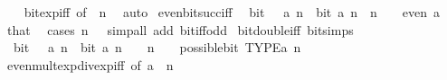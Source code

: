 \begin{isabellebody}
%
\isadelimproof
\ \ %
\endisadelimproof
%
\isatagproof
{}\isamarkupfalse%
\ bit{\isacharunderscore}{\kern0pt}exp{\isacharunderscore}{\kern0pt}iff\ {\isacharbrackleft}{\kern0pt}of\ {}\ n{\isacharbrackright}{\kern0pt}\ \isamarkupfalse%
\ auto%
\endisatagproof
{\isafoldproof}%
%
\isadelimproof
\isanewline
%
\endisadelimproof
\isanewline
{}\isamarkupfalse%
\ even{\isacharunderscore}{\kern0pt}bit{\isacharunderscore}{\kern0pt}succ{\isacharunderscore}{\kern0pt}iff{\isacharcolon}{\kern0pt}\isanewline
\ \ {\isacartoucheopen}bit\ {\isacharparenleft}{\kern0pt}{}\ {\isacharplus}{\kern0pt}\ a{\isacharparenright}{\kern0pt}\ n\ {\isasymlongleftrightarrow}\ bit\ a\ n\ {\isasymor}\ n\ {\isacharequal}{\kern0pt}\ {}{\isacartoucheclose}\ \ {\isacartoucheopen}even\ a{\isacartoucheclose}\isanewline
%
\isadelimproof
\ \ %
\endisadelimproof
%
\isatagproof
{}\isamarkupfalse%
\ that\ \isamarkupfalse%
\ {\isacharparenleft}{\kern0pt}cases\ {\isacartoucheopen}n\ {\isacharequal}{\kern0pt}\ {}{\isacartoucheclose}{\isacharparenright}{\kern0pt}\ {\isacharparenleft}{\kern0pt}simp{\isacharunderscore}{\kern0pt}all\ add{\isacharcolon}{\kern0pt}\ bit{\isacharunderscore}{\kern0pt}iff{\isacharunderscore}{\kern0pt}odd{\isacharparenright}{\kern0pt}%
\endisatagproof
{\isafoldproof}%
%
\isadelimproof
\isanewline
%
\endisadelimproof
\isanewline
{}\isamarkupfalse%
\ bit{\isacharunderscore}{\kern0pt}double{\isacharunderscore}{\kern0pt}iff\ {\isacharbrackleft}{\kern0pt}bit{\isacharunderscore}{\kern0pt}simps{\isacharbrackright}{\kern0pt}{\isacharcolon}{\kern0pt}\isanewline
\ \ {\isacartoucheopen}bit\ {\isacharparenleft}{\kern0pt}{}\ {\isacharasterisk}{\kern0pt}\ a{\isacharparenright}{\kern0pt}\ n\ {\isasymlongleftrightarrow}\ bit\ a\ {\isacharparenleft}{\kern0pt}n\ {\isacharminus}{\kern0pt}\ {}{\isacharparenright}{\kern0pt}\ {\isasymand}\ n\ {\isasymnoteq}\ {}\ {\isasymand}\ possible{\isacharunderscore}{\kern0pt}bit\ TYPE{\isacharparenleft}{\kern0pt}{\isacharprime}{\kern0pt}a{\isacharparenright}{\kern0pt}\ n{\isacartoucheclose}\isanewline
%
\isadelimproof
\ \ %
\endisadelimproof
%
\isatagproof
{}\isamarkupfalse%
\ even{\isacharunderscore}{\kern0pt}mult{\isacharunderscore}{\kern0pt}exp{\isacharunderscore}{\kern0pt}div{\isacharunderscore}{\kern0pt}exp{\isacharunderscore}{\kern0pt}iff\ {\isacharbrackleft}{\kern0pt}of\ a\ {}\ n{\isacharbrackright}{\kern0pt}\isanewline
\ \ \isamarkupfalse%

\end{isabellebody}

